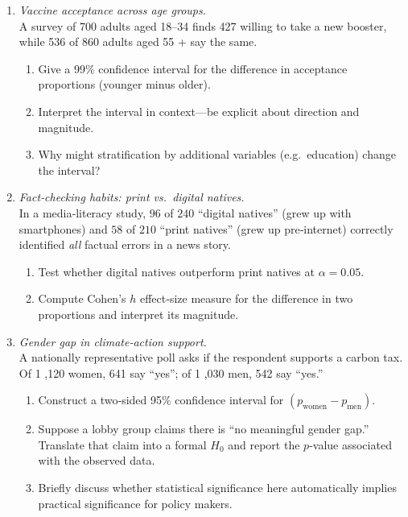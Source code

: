 \documentclass[11pt]{article}
\begin{document}
\begin{enumerate}[label=\textbf{Q\,\arabic*:}, start=11, left=0pt]
\item  \emph{Vaccine acceptance across age groups.} \\
      A survey of 700 adults aged 18–34 finds 427 willing to take a new booster, while
      536 of 860 adults aged 55 + say the same.
      \begin{enumerate}[label=(\alph*)]
          \item Give a 99\% confidence interval for the difference in acceptance proportions (younger minus older).  
          \item Interpret the interval in context—be explicit about direction and magnitude.  
          \item Why might stratification by additional variables (e.g.\ education) change the interval?
      \end{enumerate}

\item  \emph{Fact‑checking habits: print vs.\ digital natives.} \\
      In a media‑literacy study, $96$ of $240$ “digital natives” (grew up with smartphones) and $58$ of $210$ “print natives” (grew up pre‑internet)
      correctly identified \emph{all} factual errors in a news story.
      \begin{enumerate}[label=(\alph*)]
          \item Test whether digital natives outperform print natives at $\alpha=0.05$.  
          \item Compute Cohen’s $h$ effect‑size measure for the difference in two proportions and interpret its magnitude.  
      \end{enumerate}

\item  \emph{Gender gap in climate‑action support.} \\
      A nationally representative poll asks if the respondent supports a carbon tax.  
      Of 1 ,120 women, 641 say “yes”; of 1 ,030 men, 542 say “yes.”
      \begin{enumerate}[label=(\alph*)]
          \item Construct a two‑sided 95\% confidence interval for $(p_{\text{women}}-p_{\text{men}})$.  
          \item Suppose a lobby group claims there is “no meaningful gender gap.”  
                Translate that claim into a formal $H_0$ and report the $p$‑value associated with the observed data.  
          \item Briefly discuss whether statistical significance here automatically implies practical significance for policy makers.
      \end{enumerate}

\end{enumerate}
\end{document}
